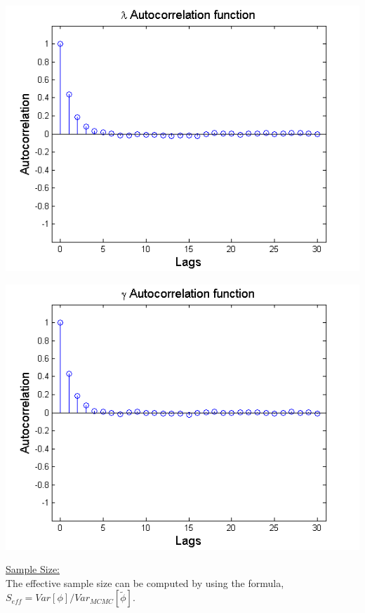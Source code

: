 \documentclass{article}
\begin{document}
\begin{description}
\noindent
\begin{left}
\includegraphics[scale=0.5]{LAutoCorr.png}
\end{left}
\begin{right}
\includegraphics[scale=0.5]{GAutoCorr.png}\\
\end{right}

\pagebreak

\underline{Sample Size:}\\
The effective sample size can be computed by using the formula, $S_{eff} = Var[\phi]/Var_{MCMC}[\tilde{\phi}].$

\end{description}
\end{document}
